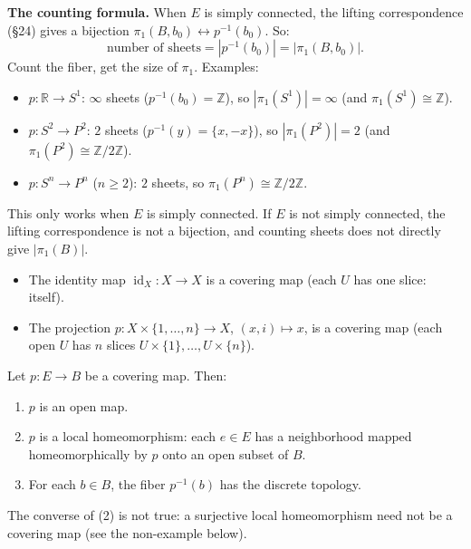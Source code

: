 \documentclass[11pt]{report}
\begin{document}
\begin{rembox}
\textbf{The counting formula.} When $E$ is simply connected, the lifting correspondence (\S 24) gives a bijection $\pi_1(B, b_0) \leftrightarrow p^{-1}(b_0)$. So:
\[\text{number of sheets} = |p^{-1}(b_0)| = |\pi_1(B, b_0)|.\]
Count the fiber, get the size of $\pi_1$. Examples:
\begin{itemize}[nosep]
    \item $p: \mathbb{R} \to S^1$: $\infty$ sheets ($p^{-1}(b_0) = \mathbb{Z}$), so $|\pi_1(S^1)| = \infty$ (and $\pi_1(S^1) \cong \mathbb{Z}$).
    \item $p: S^2 \to P^2$: $2$ sheets ($p^{-1}(y) = \{x, -x\}$), so $|\pi_1(P^2)| = 2$ (and $\pi_1(P^2) \cong \mathbb{Z}/2\mathbb{Z}$).
    \item $p: S^n \to P^n$ ($n \geq 2$): $2$ sheets, so $\pi_1(P^n) \cong \mathbb{Z}/2\mathbb{Z}$.
\end{itemize}
This only works when $E$ is simply connected. If $E$ is not simply connected, the lifting correspondence is not a bijection, and counting sheets does not directly give $|\pi_1(B)|$.
\end{rembox}

\begin{exbox}
\begin{itemize}[nosep]
    \item The identity map $\operatorname{id}_X: X \to X$ is a covering map (each $U$ has one slice: itself).
    \item The projection $p: X \times \{1, \ldots, n\} \to X$, $(x, i) \mapsto x$, is a covering map (each open $U$ has $n$ slices $U \times \{1\}, \ldots, U \times \{n\}$).
\end{itemize}
\end{exbox}

\begin{propbox}
Let $p: E \to B$ be a covering map. Then:
\begin{enumerate}
    \item $p$ is an open map.
    \item $p$ is a local homeomorphism: each $e \in E$ has a neighborhood mapped homeomorphically by $p$ onto an open subset of $B$.
    \item For each $b \in B$, the fiber $p^{-1}(b)$ has the discrete topology.
\end{enumerate}
The converse of (2) is not true: a surjective local homeomorphism need not be a covering map (see the non-example below).
\end{propbox}
\end{document}
